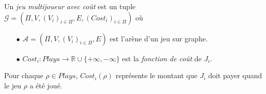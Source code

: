 
\begin{defi}
	Un \textit{jeu multijoueur avec coût} est un tuple $\mathcal{G} = (\Pi ,V ,(V_{i})_{i \in \Pi} ,E ,(Cost_{i})_{i \in \Pi})$ où
	\begin{enumerate}
		\item[$\bullet$] $\mathcal{A} = (\Pi ,V ,(V_{i})_{i \in \Pi} ,E )$ est l'arène d'un jeu sur graphe.
		\item[$\bullet$] $Cost_{i}: Plays \rightarrow \mathbb{R} \cup \{ +\infty , -\infty \} $ est la \textit{fonction de coût} de $J_{i}$. 
	\end{enumerate}
\end{defi}

\begin{rem}
	Pour chaque $\rho \in Plays$, $Cost_{i}(\rho)$ représente le montant que $J_{i}$ doit payer quand le jeu $\rho$ a été joué.
\end{rem}